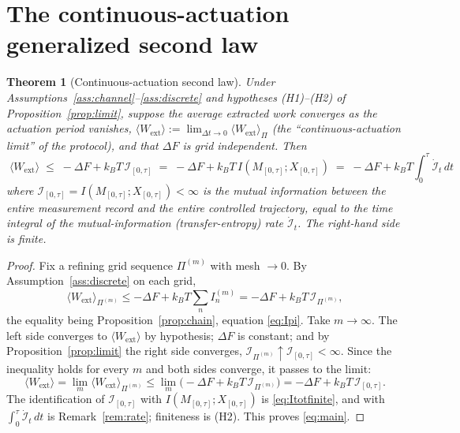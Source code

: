 \documentclass{amsart}
\newtheorem{theorem}{Theorem}
\theoremstyle{definition}
\theoremstyle{remark}
\newcommand{\kB}{k_{B}}
\newcommand{\Wext}{W_{\mathrm{ext}}}
\newcommand{\DF}{\Delta F}
\begin{document}
\section{The continuous-actuation generalized second law}

\begin{theorem}[Continuous-actuation second law]\label{thm:main}
Under Assumptions~\ref{ass:channel}--\ref{ass:discrete} and hypotheses
(H1)--(H2) of Proposition~\ref{prop:limit}, suppose the average extracted
work converges as the actuation period vanishes,
$\langle\Wext\rangle:=\lim_{\Delta t\to0}\langle\Wext\rangle_\Pi$ (the
``continuous-actuation limit'' of the protocol), and that $\DF$ is grid
independent. Then
\begin{equation}\label{eq:main}
\boxed{\;\langle\Wext\rangle\;\le\;-\DF
+\kB T\,\mathcal I_{[0,\tau]}
\;=\;-\DF+\kB T\,I\!\left(M_{[0,\tau]};X_{[0,\tau]}\right)
\;=\;-\DF+\kB T\int_0^\tau\dot{\mathcal I}_t\,dt\;}
\end{equation}
where $\mathcal I_{[0,\tau]}=I(M_{[0,\tau]};X_{[0,\tau]})<\infty$ is the
mutual information between the entire measurement record and the entire
controlled trajectory, equal to the time integral of the
mutual-information (transfer-entropy) rate $\dot{\mathcal I}_t$. The
right-hand side is finite.
\end{theorem}

\begin{proof}
Fix a refining grid sequence $\Pi^{(m)}$ with mesh $\to0$. By
Assumption~\ref{ass:discrete} on each grid,
\[
\langle\Wext\rangle_{\Pi^{(m)}}
\le-\DF+\kB T\sum_{n}I_n^{(m)}
=-\DF+\kB T\,\mathcal I_{\Pi^{(m)}},
\]
the equality being Proposition~\ref{prop:chain}, equation
\eqref{eq:Ipi}. Take $m\to\infty$. The left side converges to
$\langle\Wext\rangle$ by hypothesis; $\DF$ is constant; and by
Proposition~\ref{prop:limit} the right side converges,
$\mathcal I_{\Pi^{(m)}}\uparrow\mathcal I_{[0,\tau]}<\infty$. Since the
inequality holds for every $m$ and both sides converge, it passes to the
limit:
\[
\langle\Wext\rangle
=\lim_m\langle\Wext\rangle_{\Pi^{(m)}}
\le\lim_m\big(-\DF+\kB T\,\mathcal I_{\Pi^{(m)}}\big)
=-\DF+\kB T\,\mathcal I_{[0,\tau]}.
\]
The identification of $\mathcal I_{[0,\tau]}$ with
$I(M_{[0,\tau]};X_{[0,\tau]})$ is \eqref{eq:Itotfinite}, and with
$\int_0^\tau\dot{\mathcal I}_t\,dt$ is Remark~\ref{rem:rate}; finiteness
is (H2). This proves \eqref{eq:main}.
\end{proof}
\end{document}
